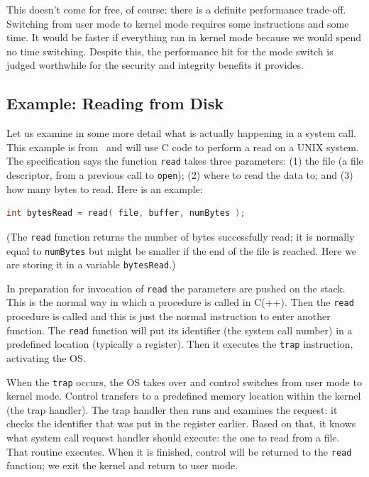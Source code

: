 \documentclass[a4paper]{report}
\begin{document}
This doesn't come for free, of course: there is a definite performance trade-off. Switching from user mode to kernel mode requires some instructions and some time. It would be faster if everything ran in kernel mode because we would spend no time switching. Despite this, the performance hit for the mode switch is judged worthwhile for the security and integrity benefits it provides.

\subsection*{Example: Reading from Disk}
Let us examine in some more detail what is actually happening in a
system call. This example is from~\cite{mos} and will use C code to
perform a read on a UNIX system. The specification says the function
\texttt{read} takes three parameters: (1) the file (a file
descriptor, from a previous call to \texttt{open}); (2) where to read
the data to; and (3) how many bytes to read. Here is an example:

\begin{lstlisting}[language=C]
int bytesRead = read( file, buffer, numBytes );
\end{lstlisting}

(The \texttt{read} function returns the number of bytes successfully read; it is normally equal to \texttt{numBytes} but might be smaller if the end of the file is reached. Here we are storing it in a variable \texttt{bytesRead}.)

In preparation for invocation of \texttt{read} the parameters are pushed on the stack. This is the normal way in which a procedure is called in C(++). Then the \texttt{read} procedure is called and this is just the normal instruction to enter another function. The \texttt{read} function will put its identifier (the system call number) in a predefined location (typically a register). Then it executes the \texttt{trap} instruction, activating the OS.

When the \texttt{trap} occurs, the OS takes over and control switches from user mode to kernel mode. Control transfers to a predefined memory location within the kernel (the trap handler). The trap handler then runs and examines the request: it checks the identifier that was put in the register earlier. Based on that, it knows what system call request handler should execute: the one to read from a file. That routine executes. When it is finished, control will be returned to the \texttt{read} function; we exit the kernel and return to user mode.
\end{document}
